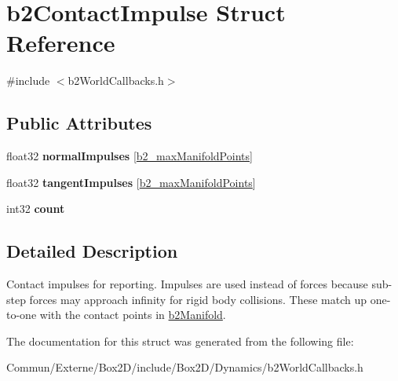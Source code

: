\hypertarget{structb2_contact_impulse}{}\section{b2\+Contact\+Impulse Struct Reference}
\label{structb2_contact_impulse}


{\ttfamily \#include $<$b2\+World\+Callbacks.\+h$>$}

\subsection*{Public Attributes}
\begin{DoxyCompactItemize}
\item 
float32 {\bfseries normal\+Impulses} \mbox{[}\hyperlink{b2_settings_8h_aa5f44cc9edf711433dea2b2ec94f3c42}{b2\+\_\+max\+Manifold\+Points}\mbox{]}\hypertarget{structb2_contact_impulse_a553d3562a3a34ea013e2d9860f6fd207}{}\label{structb2_contact_impulse_a553d3562a3a34ea013e2d9860f6fd207}

\item 
float32 {\bfseries tangent\+Impulses} \mbox{[}\hyperlink{b2_settings_8h_aa5f44cc9edf711433dea2b2ec94f3c42}{b2\+\_\+max\+Manifold\+Points}\mbox{]}\hypertarget{structb2_contact_impulse_aebd9875b1f55a90865770a53e30e609a}{}\label{structb2_contact_impulse_aebd9875b1f55a90865770a53e30e609a}

\item 
int32 {\bfseries count}\hypertarget{structb2_contact_impulse_a258e094ab0d769971f40d6c144420bf7}{}\label{structb2_contact_impulse_a258e094ab0d769971f40d6c144420bf7}

\end{DoxyCompactItemize}


\subsection{Detailed Description}
Contact impulses for reporting. Impulses are used instead of forces because sub-\/step forces may approach infinity for rigid body collisions. These match up one-\/to-\/one with the contact points in \hyperlink{structb2_manifold}{b2\+Manifold}. 

The documentation for this struct was generated from the following file\+:\begin{DoxyCompactItemize}
\item 
Commun/\+Externe/\+Box2\+D/include/\+Box2\+D/\+Dynamics/b2\+World\+Callbacks.\+h\end{DoxyCompactItemize}
